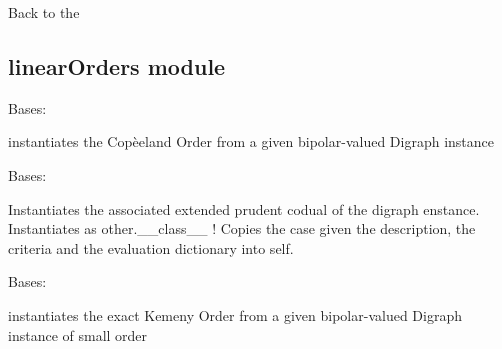 \documentclass[letterpaper,10pt,english]{sphinxmanual}
\begin{document}
Back to the {\hyperref[techDoc:technical-label]{\emph{}}}


\subsection{linearOrders module}
\label{techDoc:linearorders-module}\label{techDoc:linearorders-label}\label{techDoc:module-linearOrders}

\begin{fulllineitems}
\label{techDoc:linearOrders.CopelandOrder}
Bases: {\hyperref[techDoc:linearOrders.LinearOrder]{\emph{}}}

instantiates the Copèeland Order from
a given bipolar-valued Digraph instance

\end{fulllineitems}


\begin{fulllineitems}
\label{techDoc:linearOrders.ExtendedPrudentDigraph}
Bases: {\hyperref[techDoc:digraphs.Digraph]{\emph{}}}

Instantiates the associated extended prudent
codual of the digraph enstance.
Instantiates as other.\_\_class\_\_ !
Copies the case given the description, the criteria
and the evaluation dictionary into self.

\end{fulllineitems}


\begin{fulllineitems}
\label{techDoc:linearOrders.KemenyOrder}
Bases: {\hyperref[techDoc:linearOrders.LinearOrder]{\emph{}}}

instantiates the exact Kemeny Order from
a given bipolar-valued Digraph instance of small order

\end{fulllineitems}
\end{document}
